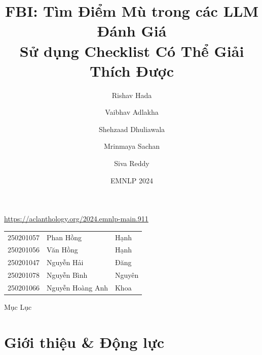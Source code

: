 \documentclass[aspectratio=169,10pt]{beamer}
\title[\fbi{} — EMNLP 2024]%
      {FBI: Tìm Điểm Mù trong các LLM Đánh Giá\\
       Sử dụng Checklist Có Thể Giải Thích Được}
\author[Hada et al., EMNLP 2024]{Rishav Hada \and Vaibhav Adlakha \and Shehzaad Dhuliawala \\
        \and Mrinmaya Sachan \and Siva Reddy}
\institute{McGill / Mila \quad ETH Zürich}
\date{EMNLP 2024}
\begin{document}

\begin{frame}
  \titlepage
  \vspace{-0.8em}
  \begin{center}
    \small\url{https://aclanthology.org/2024.emnlp-main.911}

    \vspace{0.6em}
    \small
    \begin{tabular}{cll}
      250201057 & Phan Hồng   & Hạnh   \\
      250201056 & Văn Hồng    & Hạnh   \\
      250201047 & Nguyễn Hải  & Đăng   \\
      250201078 & Nguyễn Bình & Nguyên \\
      250201066 & Nguyễn Hoàng Anh & Khoa \\
    \end{tabular}
  \end{center}
\end{frame}

\begin{frame}{Mục Lục}
  \tableofcontents
\end{frame}

\section{Giới thiệu \& Động lực}
\end{document}
